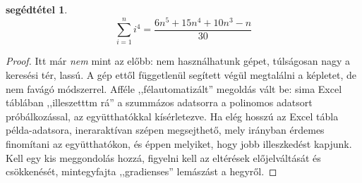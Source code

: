 \documentclass{article}
\newtheorem{lemm}{segédtétel}
\begin{document}
	\begin{lemm}
		\[
			\sum_{i=1}^n i^4 = \frac{6n^5+15n^4+10n^3-n}{30}
		\]
	\end{lemm}
	\begin{proof}
		Itt már \emph{nem} mint az előbb: nem használhatunk gépet, túlságosan nagy a keresési tér, lassú.
		A gép ettől függetlenül segített végül megtalálni a képletet, de nem favágó módszerrel.
		Afféle ,,félautomatizált'' megoldás vált be: sima Excel táblában ,,illeszetttm rá'' a szummázos adatsorra a polinomos adatsort próbálkozással, az együtthatókkal kísérletezve.
		Ha elég hosszú az Excel tábla példa-adatsora, ineraraktívan szépen megsejthető, mely irányban érdemes finomítani az együtthatókon, és éppen melyiket, hogy jobb illeszkedést kapjunk.
		Kell egy kis meggondolás hozzá, figyelni kell az eltérések előjelváltását és csökkenését, mintegyfajta ,,gradienses'' lemászást a hegyről.


\end{proof}
\end{document}
